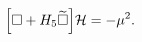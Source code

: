 \begin{equation}
\Bigl[\square+H_5\widetilde{\square}\Bigr]{\cal H}=-\mu^2.
\label{eq:calheqn}
\end{equation}

